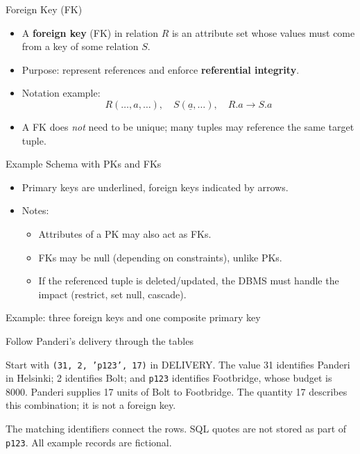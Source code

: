 \documentclass[10pt,aspectratio=169]{beamer}
\newcommand{\keyattr}[1]{\underline{#1}}
\begin{document}
\begin{frame}{Foreign Key (FK)}
\small
\begin{itemize}
  \item A \textbf{foreign key} (FK) in relation $R$ is an attribute set whose values must come from a key of some relation $S$.
  \item Purpose: represent references and enforce \textbf{referential integrity}.
  \item Notation example:
  \[
    R(\ldots, a, \ldots), \quad S(\keyattr{a},\ldots), \quad R.a \rightarrow S.a
  \]
  \item A FK does \emph{not} need to be unique; many tuples may reference the same target tuple.
\end{itemize}
\end{frame}

\begin{frame}{Example Schema with PKs and FKs}
\small
\begin{itemize}
  \item Primary keys are underlined, foreign keys indicated by arrows.
  \item Notes:
  \begin{itemize}
    \item Attributes of a PK may also act as FKs.
    \item FKs may be null (depending on constraints), unlike PKs.
    \item If the referenced tuple is deleted/updated, the DBMS must handle the impact (restrict, set null, cascade).
  \end{itemize}
\end{itemize}

\end{frame}

\begin{frame}{Example: three foreign keys and one composite primary key}
\centering
\resizebox{!}{0.85\textheight}{}

\end{frame}

\begin{frame}{Follow Panderi's delivery through the tables}

\medskip
\small
Start with \texttt{(31, 2, 'p123', 17)} in DELIVERY. The value 31 identifies
Panderi in Helsinki; 2 identifies Bolt; and \texttt{p123} identifies
Footbridge, whose budget is 8000. Panderi supplies 17 units of Bolt to Footbridge.
The quantity 17 describes this combination; it is not a foreign key.

\medskip
\footnotesize
The matching identifiers connect the rows. SQL quotes are not stored as part
of \texttt{p123}. All example records are fictional.
\end{frame}
\end{document}
